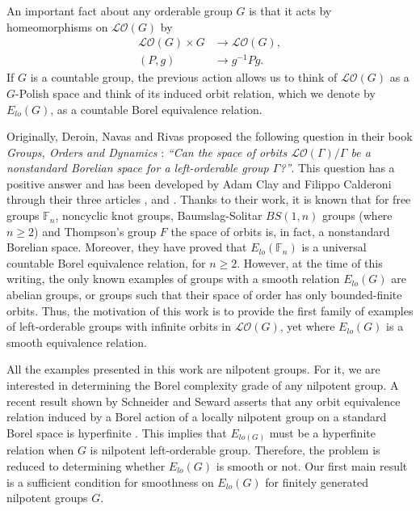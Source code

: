 \documentclass[12pt]{article}
\theoremstyle{definition}
\begin{document}
An important fact about any orderable group $G$ is that it acts by homeomorphisms on $\mathcal{LO}(G)$ by 
\begin{align*}
    \mathcal{LO}(G)\times G&\longrightarrow \mathcal{LO}(G),\\(P,g)&\longrightarrow g^{-1}Pg.
\end{align*} 
If $G$ is a countable group, the previous action allows us to think of $\mathcal{LO}(G)$ as a $G$-Polish space and think of its induced orbit relation, which we denote by $E_{lo}(G)$, as a countable Borel equivalence relation.

Originally, Deroin, Navas and Rivas proposed the following question in their book \textit{Groups, Orders and Dynamics} \cite{GOD}: {\it ``Can the space of orbits $\mathcal{LO}(\Gamma)/\Gamma$ be a nonstandard Borelian space for a left-orderable group $\Gamma$?''}.
This question has a positive answer and has been developed by Adam Clay and Filippo Calderoni through their three articles \cite{ClayCalderoni1}, \cite{ClayCalderoni2} {\color{violet} and} \cite{ClayCalderoni3}. Thanks to their work, it is known that for free groups $\mathbb{F}_n$, noncyclic knot groups, Baumslag-Solitar $BS(1,n)$ groups (where $n\geq 2$) and Thompson's group $F$  the space of orbits is, in fact, a nonstandard Borelian space. Moreover, they have proved that $E_{lo}(\mathbb{F}_n)$ is a universal countable Borel equivalence relation, for $n\geq 2$. However, at the time of this writing, the only known examples of groups with a smooth relation $E_{lo}(G)$ are abelian groups, or groups such that their space of order has only bounded-finite orbits.
Thus, the motivation of this work is to provide the first family of examples of left-orderable groups with infinite orbits in $\mathcal{LO}(G)$, yet where $E_{lo}(G)$ is a smooth equivalence relation. 

All the examples presented in this work are nilpotent groups. For it, we are interested in determining the Borel complexity grade of any nilpotent group. A recent result shown by Schneider and Seward asserts that any orbit equivalence relation induced by a Borel action of a locally nilpotent group on a standard Borel space is hyperfinite \cite[Theorem 1.1]{SS}. 
This implies that $E_{lo(G)}$ must be a hyperfinite relation when $G$ is nilpotent left-orderable group. Therefore, the problem is reduced to determining whether $E_{lo}(G)$ is smooth or not. Our first main result is a sufficient condition for smoothness on $E_{lo}(G)$ for finitely generated nilpotent groups $G$.
\end{document}
